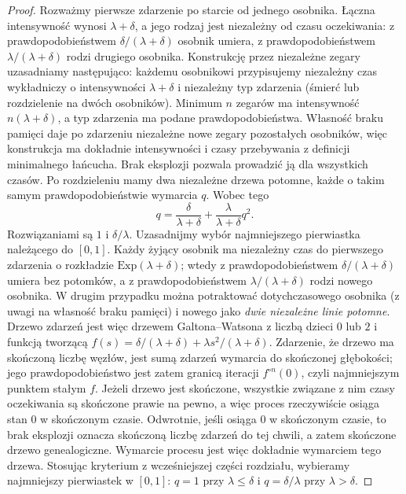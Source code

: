 \begin{proof}
Rozważmy pierwsze zdarzenie po starcie od jednego osobnika.
Łączna intensywność wynosi $\lambda+\delta$, a jego rodzaj
jest niezależny od czasu oczekiwania: z prawdopodobieństwem
$\delta/(\lambda+\delta)$ osobnik umiera, z prawdopodobieństwem
$\lambda/(\lambda+\delta)$ rodzi drugiego osobnika.
Konstrukcję przez niezależne zegary uzasadniamy
następująco: każdemu osobnikowi przypisujemy niezależny
czas wykładniczy o intensywności $\lambda+\delta$
i niezależny typ zdarzenia (śmierć lub rozdzielenie
na dwóch osobników). Minimum $n$ zegarów ma
intensywność $n(\lambda+\delta)$, a typ zdarzenia
ma podane prawdopodobieństwa. Własność braku pamięci
daje po zdarzeniu niezależne nowe zegary pozostałych
osobników, więc konstrukcja ma dokładnie intensywności
i czasy przebywania z definicji minimalnego łańcucha.
Brak eksplozji pozwala prowadzić ją dla wszystkich czasów.
Po rozdzieleniu mamy dwa niezależne drzewa potomne,
każde o takim samym prawdopodobieństwie wymarcia $q$.
Wobec tego
\[
q=\frac{\delta}{\lambda+\delta}
+\frac{\lambda}{\lambda+\delta}q^2.
\]
Rozwiązaniami są $1$ i $\delta/\lambda$.
Uzasadnijmy wybór najmniejszego pierwiastka należącego do $[0,1]$. Każdy żyjący
osobnik ma niezależny czas do pierwszego zdarzenia
o rozkładzie $\mathrm{Exp}(\lambda+\delta)$; wtedy
z prawdopodobieństwem $\delta/(\lambda+\delta)$
umiera bez potomków, a z prawdopodobieństwem
$\lambda/(\lambda+\delta)$ rodzi nowego osobnika.
W drugim przypadku można potraktować dotychczasowego
osobnika (z uwagi na własność braku pamięci) i nowego
jako \emph{dwie niezależne linie potomne}. Drzewo
zdarzeń jest więc drzewem Galtona--Watsona z liczbą
dzieci $0$ lub $2$ i funkcją tworzącą
$f(s)=\delta/(\lambda+\delta)+\lambda s^2/(\lambda+\delta)$.
Zdarzenie, że drzewo ma skończoną liczbę węzłów,
jest sumą zdarzeń wymarcia do skończonej głębokości;
jego prawdopodobieństwo jest zatem granicą iteracji
$f^{\circ n}(0)$, czyli najmniejszym punktem stałym $f$.
Jeżeli drzewo jest skończone, wszystkie związane z nim
czasy oczekiwania są skończone prawie na pewno,
a więc proces rzeczywiście osiąga stan $0$ w skończonym
czasie. Odwrotnie, jeśli osiąga $0$ w skończonym czasie,
to brak eksplozji oznacza skończoną liczbę zdarzeń do tej
chwili, a zatem skończone drzewo genealogiczne.
Wymarcie procesu jest więc dokładnie wymarciem tego drzewa.
Stosując kryterium z wcześniejszej części rozdziału,
wybieramy najmniejszy pierwiastek w $[0,1]$: $q=1$ przy
$\lambda\le\delta$ i $q=\delta/\lambda$ przy
$\lambda>\delta$.
\end{proof}

